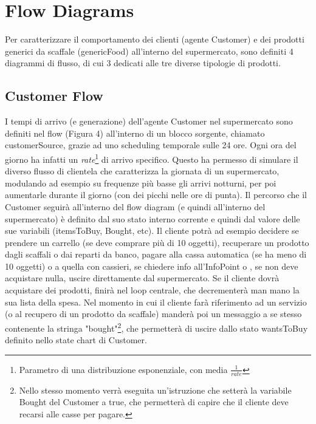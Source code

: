 \documentclass{article}
\begin{document}
\section{Flow Diagrams}
Per caratterizzare il comportamento dei clienti (agente Customer) e dei prodotti generici da scaffale (genericFood) all'interno del supermercato, sono definiti 4 diagrammi di flusso, di cui 3 dedicati alle tre diverse tipologie di prodotti.
\subsection{Customer Flow}
I tempi di arrivo (e generazione) dell'agente Customer nel supermercato sono definiti nel flow (Figura 4) all'interno di un blocco sorgente, chiamato \textsf{customerSource}, grazie ad uno scheduling temporale sulle 24 ore. Ogni ora del giorno ha infatti un \textit{rate}\footnote{Parametro di una distribuzione esponenziale, con media $\frac{1}{rate} $ } di arrivo specifico. Questo ha permesso di simulare il diverso flusso di clientela che caratterizza la giornata di un supermercato, modulando ad esempio su frequenze più basse gli arrivi notturni, per poi aumentarle durante il giorno (con dei picchi nelle ore di punta).
\newline
\newline
Il percorso che il Customer seguirà all'interno del flow diagram (e quindi all'interno del supermercato) è definito dal suo stato interno corrente e quindi dal valore delle sue variabili (itemsToBuy, Bought, etc). Il cliente potrà ad esempio decidere se prendere un carrello (se deve comprare più di 10 oggetti), recuperare un prodotto dagli scaffali o dai reparti da banco, pagare alla cassa automatica (se ha meno di 10 oggetti) o a quella con cassieri, se chiedere info all'InfoPoint o , se non deve acquistare nulla, uscire direttamente dal supermercato.
\newline
\newline
Se il cliente dovrà acquistare dei prodotti, finirà nel loop centrale, che decrementerà man mano la sua lista della spesa. Nel momento in cui il cliente farà riferimento ad un servizio (o al recupero di un prodotto da scaffale) manderà poi un messaggio a se stesso contenente la stringa "bought"\footnote{\footnotesize{Nello stesso momento verrà eseguita un'istruzione che setterà la variabile \textsf{Bought} del Customer a \textsf{true}, che permetterà di capire che il cliente deve recarsi alle casse per pagare.}}, che permetterà di uscire dallo stato wantsToBuy definito nello state chart di Customer.
\end{document}
